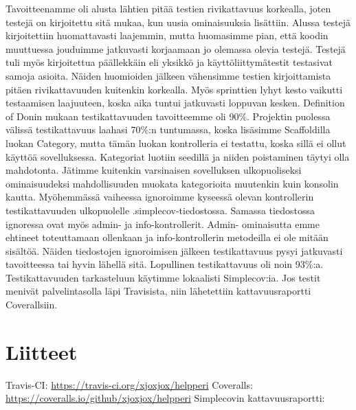 \documentclass[a4paper,12pt, titlepage]{article}
\begin{document}
Tavoitteenamme oli alusta lähtien pitää testien rivikattavuus korkealla, joten testejä on kirjoitettu sitä mukaa, kun uusia ominaisuuksia lisättiin. Alussa testejä kirjoitettiin huomattavasti laajemmin, mutta huomasimme pian, että koodin muuttuessa jouduimme jatkuvasti korjaamaan jo olemassa olevia testejä. Testejä tuli myös kirjoitettua päällekkäin eli yksikkö ja käyttöliittymätestit testasivat samoja asioita. Näiden huomioiden jälkeen vähensimme testien kirjoittamista pitäen rivikattavuuden kuitenkin korkealla. Myös sprinttien lyhyt kesto vaikutti testaamisen laajuuteen, koska aika tuntui jatkuvasti loppuvan kesken. Definition of Donin mukaan testikattavuuden tavoitteemme oli 90\%. Projektin puolessa välissä testikattavuus laahasi 70\%:n tuntumassa, koska lisäsimme Scaffoldilla luokan Category, mutta tämän luokan kontrolleria ei testattu, koska sillä ei ollut käyttöä sovelluksessa. Kategoriat luotiin seedillä ja niiden poistaminen täytyi olla mahdotonta. Jätimme kuitenkin varsinaisen sovelluksen ulkopuoliseksi ominaisuudeksi mahdollisuuden muokata kategorioita muutenkin kuin konsolin kautta. Myöhemmässä vaiheessa ignoroimme kyseessä olevan kontrollerin testikattavuuden ulkopuolelle .simplecov-tiedostossa. Samassa tiedostossa ignoressa ovat myös admin- ja info-kontrollerit. Admin- ominaisutta emme ehtineet toteuttamaan ollenkaan ja info-kontrollerin metodeilla ei ole mitään sisältöä. Näiden tiedostojen ignoroimisen jälkeen testikattavuus pysyi jatkuvasti tavoitteessa tai hyvin lähellä sitä. Lopullinen testikattavuus oli noin 93\%:a.
Testikattavuuden tarkasteluun käytimme lokaalisti Simplecov:ia. Jos testit menivät palvelintasolla läpi Travisista, niin lähetettiin kattavuusraportti Coverallsiin.

\section{Liitteet}

Travis-CI:
\url{https://travis-ci.org/xjoxjox/helpperi}
\newline
Coveralls:
\url{https://coveralls.io/github/xjoxjox/helpperi}
\newline
\newline
Simplecovin kattavuusraportti:
\newline
\newline
\noindent{}
\end{document}

